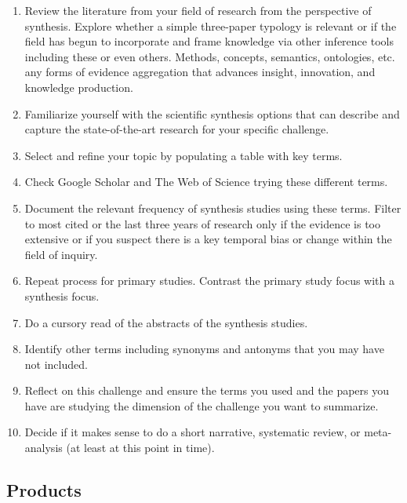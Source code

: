 \documentclass[
]{book}
\providecommand{\tightlist}{%
  \setlength{\itemsep}{0pt}\setlength{\parskip}{0pt}}
\begin{document}
\begin{enumerate}
\def\labelenumi{\arabic{enumi}.}
\tightlist
\item
  Review the literature from your field of research from the perspective of synthesis. Explore whether a simple three-paper typology is relevant or if the field has begun to incorporate and frame knowledge via other inference tools including these or even others. Methods, concepts, semantics, ontologies, etc. any forms of evidence aggregation that advances insight, innovation, and knowledge production.\\
\item
  Familiarize yourself with the scientific synthesis options that can describe and capture the state-of-the-art research for your specific challenge.\\
\item
  Select and refine your topic by populating a table with key terms.\\
\item
  Check Google Scholar and The Web of Science trying these different terms.\\
\item
  Document the relevant frequency of synthesis studies using these terms. Filter to most cited or the last three years of research only if the evidence is too extensive or if you suspect there is a key temporal bias or change within the field of inquiry.\\
\item
  Repeat process for primary studies. Contrast the primary study focus with a synthesis focus.\\
\item
  Do a cursory read of the abstracts of the synthesis studies.\\
\item
  Identify other terms including synonyms and antonyms that you may have not included.\\
\item
  Reflect on this challenge and ensure the terms you used and the papers you have are studying the dimension of the challenge you want to summarize.\\
\item
  Decide if it makes sense to do a short narrative, systematic review, or meta-analysis (at least at this point in time).
\end{enumerate}

\hypertarget{products}{%
\subsection*{Products}\label{products}}
\end{document}
